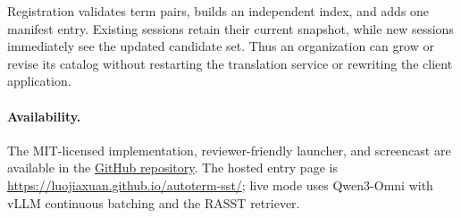 Registration validates term pairs, builds an independent index, and adds one
manifest entry. Existing sessions retain their current snapshot, while new
sessions immediately see the updated candidate set. Thus an organization can
grow or revise its catalog without restarting the translation service or
rewriting the client application.

\paragraph{Availability.}
The MIT-licensed implementation, reviewer-friendly launcher, and screencast are
available in the
\href{https://github.com/luojiaxuan/autoterm-sst}{GitHub repository}. The
hosted entry page is
\url{https://luojiaxuan.github.io/autoterm-sst/}; live mode uses Qwen3-Omni
with vLLM continuous batching and the RASST retriever.
